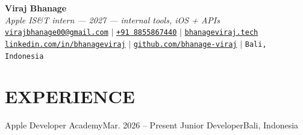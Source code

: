 


\begin{center}
    \textbf{\Huge Viraj Bhanage} \\ \vspace{4pt}
    {\small\textit{Apple IS\&T intern --- 2027 --- internal tools, iOS + APIs}} \\ \vspace{4pt}
    \small
    \faEnvelope \hspace{2pt} \href{mailto:virajbhanage00@gmail.com}{\texttt{virajbhanage00@gmail.com}} \hspace{1pt} $|$
    \hspace{1pt} \faPhone \hspace{2pt} \href{tel:+918855867440}{\texttt{+91 8855867440}} \hspace{1pt} $|$
    \hspace{1pt} \href{https://www.bhanageviraj.tech}{\texttt{bhanageviraj.tech}} \\
    \faLinkedin \hspace{2pt} \href{https://www.linkedin.com/in/bhanageviraj/}{\texttt{linkedin.com/in/bhanageviraj}} \hspace{1pt} $|$
    \hspace{1pt} \faGithub \hspace{2pt} \href{https://github.com/bhanage-viraj}{\texttt{github.com/bhanage-viraj}} \hspace{1pt} $|$
    \hspace{1pt} \faMapMarker* \hspace{2pt}\texttt{Bali, Indonesia}
\end{center}

\section{EXPERIENCE}
  \resumeSubHeadingListStart
    \resumeSubheading
      {Apple Developer Academy}{Mar. 2026 -- Present}
      {Junior Developer}{Bali, Indonesia}
      \resumeItemListStart
      \resumeItemListEnd
  \resumeSubHeadingListEnd

